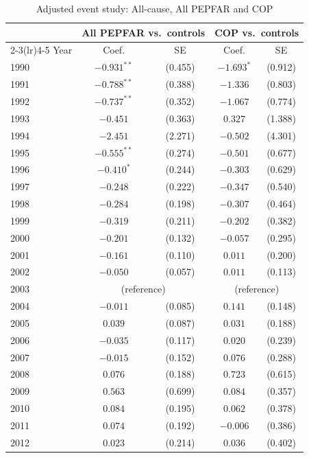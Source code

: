 \begin{table}[htbp]
\centering
\small
\caption{Adjusted event study: All-cause, All PEPFAR and COP}
\label{tab:es_combined_mort_allcause}
\begin{tabular}{lcccc}
\toprule
 & \multicolumn{2}{c}{All PEPFAR vs.\ controls} & \multicolumn{2}{c}{COP vs.\ controls} \\
\cmidrule(lr){2-3}\cmidrule(lr){4-5}
Year & Coef. & SE & Coef. & SE \\
\midrule
1990 & $-0.931^{**}$ & (0.455) & $-1.693^{*}$ & (0.912) \\
1991 & $-0.788^{**}$ & (0.388) & $-1.336$ & (0.803) \\
1992 & $-0.737^{**}$ & (0.352) & $-1.067$ & (0.774) \\
1993 & $-0.451$ & (0.363) & $0.327$ & (1.388) \\
1994 & $-2.451$ & (2.271) & $-0.502$ & (4.301) \\
1995 & $-0.555^{**}$ & (0.274) & $-0.501$ & (0.677) \\
1996 & $-0.410^{*}$ & (0.244) & $-0.303$ & (0.629) \\
1997 & $-0.248$ & (0.222) & $-0.347$ & (0.540) \\
1998 & $-0.284$ & (0.198) & $-0.307$ & (0.464) \\
1999 & $-0.319$ & (0.211) & $-0.202$ & (0.382) \\
2000 & $-0.201$ & (0.132) & $-0.057$ & (0.295) \\
2001 & $-0.161$ & (0.110) & $0.011$ & (0.200) \\
2002 & $-0.050$ & (0.057) & $0.011$ & (0.113) \\
2003 & \multicolumn{2}{c}{(reference)} & \multicolumn{2}{c}{(reference)} \\
2004 & $-0.011$ & (0.085) & $0.141$ & (0.148) \\
2005 & $0.039$ & (0.087) & $0.031$ & (0.188) \\
2006 & $-0.035$ & (0.117) & $0.020$ & (0.239) \\
2007 & $-0.015$ & (0.152) & $0.076$ & (0.288) \\
2008 & $0.076$ & (0.188) & $0.723$ & (0.615) \\
2009 & $0.563$ & (0.699) & $0.084$ & (0.357) \\
2010 & $0.084$ & (0.195) & $0.062$ & (0.378) \\
2011 & $0.074$ & (0.192) & $-0.006$ & (0.386) \\
2012 & $0.023$ & (0.214) & $0.036$ & (0.402) \\

\end{tabular}
\end{table}

